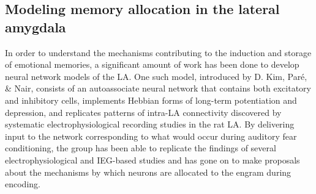 \documentclass[12pt,a4paperpaper,]{report}
\begin{document}
\subsection{Modeling memory allocation in the lateral
amygdala}\label{modeling-memory-allocation-in-the-lateral-amygdala}

In order to understand the mechanisms contributing to the induction and
storage of emotional memories, a significant amount of work has been
done to develop neural network models of the LA. One such model,
introduced by D. Kim, Paré, \& Nair, consists of an autoassociate neural
network that contains both excitatory and inhibitory cells, implements
Hebbian forms of long-term potentiation and depression, and replicates
patterns of intra-LA connectivity discovered by systematic
electrophysiological recording studies in the rat LA. By delivering
input to the network corresponding to what would occur during auditory
fear conditioning, the group has been able to replicate the findings of
several electrophysiological and IEG-based studies and has gone on to
make proposals about the mechanisms by which neurons are allocated to
the engram during encoding.
\end{document}
